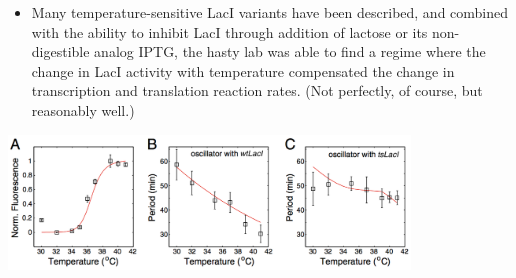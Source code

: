 \documentclass{article}
\begin{document}
\begin{itemize}
\item Many temperature-sensitive LacI variants have been described, and combined with the ability to inhibit LacI through addition of lactose or its non-digestible analog IPTG, the hasty lab was able to find a regime where the change in LacI activity with temperature compensated the change in transcription and translation reaction rates. (Not perfectly, of course, but reasonably well.)
\end{itemize}
\begin{center}
\includegraphics[width=0.8\textwidth]{hasty_tempcomp_results.png}
\end{center}
\end{document}
